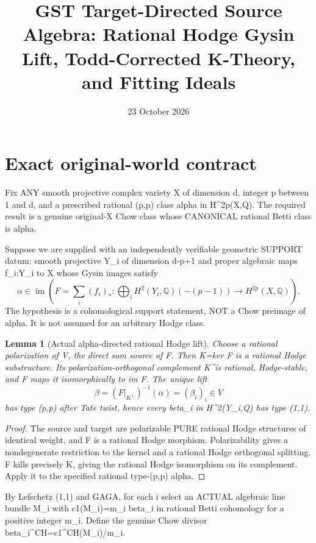 \documentclass[11pt]{article}
\title{GST Target-Directed Source Algebra: Rational Hodge Gysin Lift, Todd-Corrected K-Theory, and Fitting Ideals}
\date{23 October 2026}
\newtheorem{lemma}[theorem]{Lemma}
\begin{document}
\maketitle
\section{Exact original-world contract}
Fix ANY smooth projective complex variety X of dimension d, integer p between 1 and d, and a prescribed rational (p,p) class alpha in H^{2p}(X,Q). The required result is a genuine original-X Chow class whose CANONICAL rational Betti class is alpha.

Suppose we are supplied with an independently verifiable geometric SUPPORT datum: smooth projective Y_i of dimension d-p+1 and proper algebraic maps f_i:Y_i to X whose Gysin images satisfy
\[
 \alpha\in\operatorname{im}\left(
 F=\sum_i(f_i)_*:
 \bigoplus_i H^2(Y_i,\mathbb Q)(-(p-1))
 \longrightarrow H^{2p}(X,\mathbb Q)\right).       \tag{1}
\]
The hypothesis is a cohomological support statement, NOT a Chow preimage of alpha. It is not assumed for an arbitrary Hodge class.

\begin{lemma}[Actual alpha-directed rational Hodge lift]
Choose a rational polarization of V, the direct sum source of F. Then K=ker F is a rational Hodge substructure. Its polarization-orthogonal complement K^\perp is rational, Hodge-stable, and F maps it isomorphically to im F. The unique lift
\[
 \boxed{\beta=(F|_{K^\perp})^{-1}(\alpha)
         =(\beta_i)_i\in V}                        \tag{2}
\]
has type (p,p) after Tate twist, hence every beta_i in H^2(Y_i,Q) has type (1,1).
\end{lemma}
\begin{proof}
The source and target are polarizable PURE rational Hodge structures of identical weight, and F is a rational Hodge morphism. Polarizability gives a nondegenerate restriction to the kernel and a rational Hodge orthogonal splitting. F kills precisely K, giving the rational Hodge isomorphism on its complement. Apply it to the specified rational type-(p,p) alpha.
\end{proof}

By Lefschetz (1,1) and GAGA, for each i select an ACTUAL algebraic line bundle M_i with c1(M_i)=m_i beta_i in rational Betti cohomology for a positive integer m_i. Define the genuine Chow divisor beta_i^CH=c1^CH(M_i)/m_i.
\end{document}
